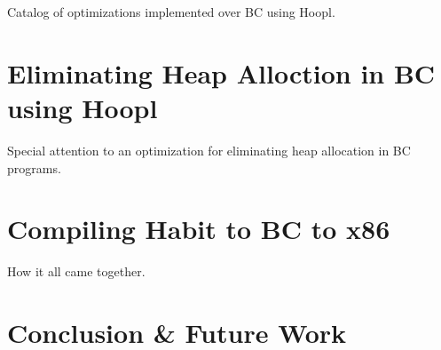 \documentclass[11pt]{article}
\begin{document}
Catalog of optimizations implemented over BC using Hoopl.

\section{Eliminating Heap Alloction in BC using Hoopl}

Special attention to an optimization for eliminating heap allocation
in BC programs.

\section{Compiling Habit to BC to x86}

How it all came together.

\section{Conclusion \& Future Work}
\end{document}
